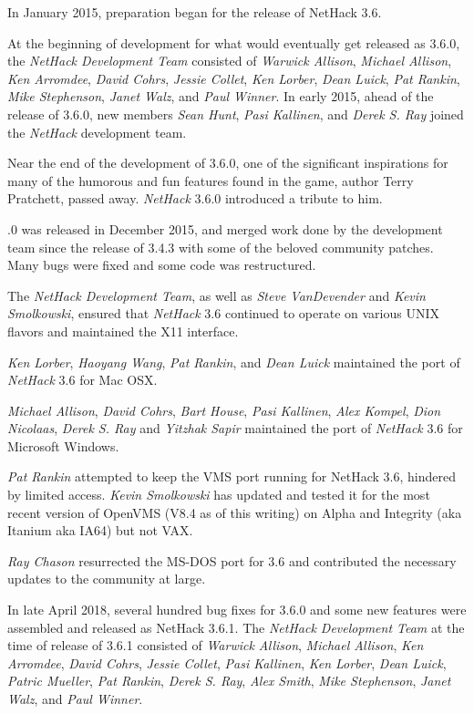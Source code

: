 \medskip
In January 2015, preparation began for the release of NetHack 3.6.

\medskip
At the beginning of development for what would eventually get released as
3.6.0, the {\it NetHack Development Team} consisted of {\it Warwick Allison},
{\it Michael Allison}, {\it Ken Arromdee},
{\it David Cohrs}, {\it Jessie Collet},
{\it Ken Lorber}, {\it Dean Luick}, {\it Pat Rankin},
{\it Mike Stephenson}, {\it Janet Walz}, and {\it Paul Winner}.
In early 2015, ahead of the release of 3.6.0, new members
{\it Sean Hunt}, {\it Pasi Kallinen}, and {\it Derek S. Ray}
joined the {\it NetHack\/} development team.

\medskip
Near the end of the development of 3.6.0, one of the significant inspirations
for many of the humorous and fun features found in the game,
author Terry Pratchett, passed away. {\it NetHack\/} 3.6.0 introduced
a tribute to him.

.0 was released in December 2015, and merged work done by the development
team since the release of 3.4.3 with some of the beloved community
patches.  Many bugs were fixed and some code was restructured.

\medskip
The {\it NetHack Development Team}, as well as {\it Steve VanDevender} and
{\it Kevin Smolkowski}, ensured that {\it NetHack\/} 3.6 continued to
operate on various UNIX flavors and maintained the X11 interface.

\medskip
{\it Ken Lorber}, {\it Haoyang Wang}, {\it Pat Rankin}, and {\it Dean Luick}
maintained the port of {\it NetHack\/} 3.6 for Mac OSX.

\medskip
{\it Michael Allison}, {\it David Cohrs}, {\it Bart House},
{\it Pasi Kallinen}, {\it Alex Kompel}, {\it Dion Nicolaas},
{\it Derek S. Ray} and  {\it Yitzhak Sapir}
maintained the port of  {\it NetHack\/} 3.6 for Microsoft Windows.

\medskip
{\it Pat Rankin} attempted to keep the VMS port running for NetHack 3.6,
hindered by limited access.  {\it Kevin Smolkowski} has updated and tested it
for the most recent version of OpenVMS (V8.4 as of this writing) on Alpha
and Integrity (aka Itanium aka IA64) but not VAX.

\medskip
{\it Ray Chason}  resurrected the MS-DOS port for 3.6 and contributed the
necessary updates to the community at large.

\medskip
In late April 2018, several hundred bug fixes for 3.6.0 and some new features
were assembled and released as NetHack 3.6.1.
The {\it NetHack Development Team} at the
time of release of 3.6.1 consisted of
{\it Warwick Allison}, {\it Michael Allison}, {\it Ken Arromdee},
{\it David Cohrs}, {\it Jessie Collet},
{\it Pasi Kallinen}, {\it Ken Lorber}, {\it Dean Luick},
{\it Patric Mueller}, {\it Pat Rankin}, {\it Derek S. Ray},
{\it Alex Smith}, {\it Mike Stephenson}, {\it Janet Walz}, and
{\it Paul Winner}.

